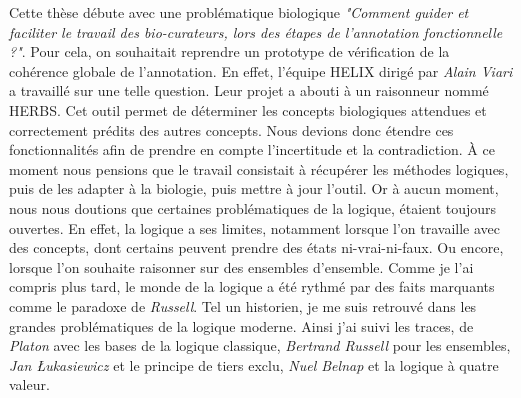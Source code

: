 \begin{refsegment}
Cette thèse débute avec une problématique biologique \textit{"Comment guider et faciliter le travail des bio-curateurs, lors des étapes de l'annotation fonctionnelle ?"}. Pour cela, on souhaitait reprendre un prototype de vérification de la cohérence globale de l'annotation. En effet, l'équipe HELIX dirigé par \textit{Alain Viari} a travaillé sur une telle question. Leur projet a abouti à un raisonneur nommé HERBS. Cet outil permet de déterminer les concepts biologiques attendues et correctement prédits des autres concepts. Nous devions donc étendre ces fonctionnalités afin de prendre en compte l'incertitude et la contradiction. À ce moment nous pensions que le travail consistait à récupérer les méthodes logiques, puis de les adapter à la biologie, puis mettre à jour l'outil. Or à aucun moment, nous nous doutions que certaines problématiques de la logique, étaient toujours ouvertes. En effet, la logique a ses limites, notamment lorsque l'on travaille avec des concepts, dont certains peuvent prendre des états ni-vrai-ni-faux. Ou encore, lorsque l'on souhaite raisonner sur des ensembles d'ensemble. Comme je l'ai compris plus tard, le monde de la logique a été rythmé par des faits marquants comme le paradoxe de \textit{Russell}. Tel un historien, je me suis retrouvé dans les grandes problématiques de la logique moderne. Ainsi j'ai suivi les traces, de \textit{Platon} avec les bases de la logique classique, \textit{Bertrand Russell} pour les ensembles, \textit{Jan Łukasiewicz} et le principe de tiers exclu, \textit{Nuel Belnap} et la logique à quatre valeur.



\end{refsegment}
